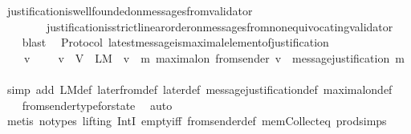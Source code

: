 \begin{isabellebody}
\isatagproof
{}\isamarkupfalse%
\ justification{\isacharunderscore}is{\isacharunderscore}well{\isacharunderscore}founded{\isacharunderscore}on{\isacharunderscore}messages{\isacharunderscore}from{\isacharunderscore}validator\isanewline
\ \ \ \ \ \ \ \ justification{\isacharunderscore}is{\isacharunderscore}strict{\isacharunderscore}linear{\isacharunderscore}order{\isacharunderscore}on{\isacharunderscore}messages{\isacharunderscore}from{\isacharunderscore}non{\isacharunderscore}equivocating{\isacharunderscore}validator\ \isanewline
\ \ \isamarkupfalse%
\ blast%
\endisatagproof
{\isafoldproof}%
%
\isadelimproof
\isanewline
%
\endisadelimproof
\isanewline
{}\isamarkupfalse%
\ {\isacharparenleft}\ Protocol{\isacharparenright}\ latest{\isacharunderscore}message{\isacharunderscore}is{\isacharunderscore}maximal{\isacharunderscore}element{\isacharunderscore}of{\isacharunderscore}justification\ {\isacharcolon}\isanewline
\ \ {\isachardoublequoteopen}{\isasymforall}\ {\isasymsigma}\ v{\isachardot}\ {\isasymsigma}\ {\isasymin}\ {\isasymSigma}\ {\isasymand}\ v\ {\isasymin}\ V\ {\isasymlongrightarrow}\ L{\isacharunderscore}M\ {\isasymsigma}\ v\ {\isacharequal}\ {\isacharbraceleft}m{\isachardot}\ maximal{\isacharunderscore}on\ {\isacharparenleft}from{\isacharunderscore}sender\ {\isacharparenleft}v{\isacharcomma}\ {\isasymsigma}{\isacharparenright}{\isacharparenright}\ message{\isacharunderscore}justification\ m{\isacharbraceright}{\isachardoublequoteclose}\isanewline
%
\isadelimproof
\ \ %
\endisadelimproof
%
\isatagproof
{}\isamarkupfalse%
\ {\isacharparenleft}simp\ add{\isacharcolon}\ L{\isacharunderscore}M{\isacharunderscore}def\ later{\isacharunderscore}from{\isacharunderscore}def\ later{\isacharunderscore}def\ message{\isacharunderscore}justification{\isacharunderscore}def\ maximal{\isacharunderscore}on{\isacharunderscore}def{\isacharparenright}\isanewline
\ \ \isamarkupfalse%
\ from{\isacharunderscore}sender{\isacharunderscore}type{\isacharunderscore}for{\isacharunderscore}state\ \isamarkupfalse%
\ auto\isanewline
\ \ \isamarkupfalse%
\ {\isacharparenleft}metis\ {\isacharparenleft}no{\isacharunderscore}types{\isacharcomma}\ lifting{\isacharparenright}\ IntI\ empty{\isacharunderscore}iff\ from{\isacharunderscore}sender{\isacharunderscore}def\ mem{\isacharunderscore}Collect{\isacharunderscore}eq\ prod{\isachardot}simps{\isacharparenleft}{}{\isacharparenright}{\isacharparenright}\isanewline
\ \ \isamarkupfalse%

\end{isabellebody}

